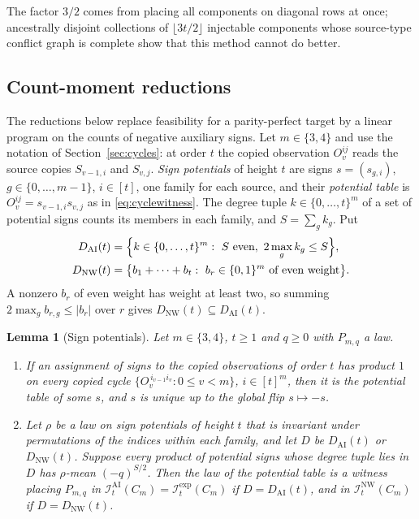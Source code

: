 \documentclass[11pt]{article}
\theoremstyle{plain}
\newtheorem{lemma}[theorem]{Lemma}
\theoremstyle{definition}
\newcommand{\INW}{\mathcal I^{\mathrm{NW}}}
\newcommand{\IAI}{\mathcal I^{\mathrm{AI}}}
\newcommand{\Iexp}{\mathcal I^{\mathrm{exp}}}
\begin{document}
The factor $3/2$ comes from placing all components on diagonal rows at once; ancestrally disjoint collections of $\lfloor3t/2\rfloor$ injectable components whose source-type conflict graph is complete show that this method cannot do better.

\subsection{Count-moment reductions}\label{app:countmoment}

The reductions below replace feasibility for a parity-perfect target by a linear program on the counts of negative auxiliary signs. Let $m\in\{3,4\}$ and use the notation of Section~\ref{sec:cycles}: at order $t$ the copied observation $O_v^{ij}$ reads the source copies $S_{v-1,i}$ and $S_{v,j}$. \emph{Sign potentials} of height $t$ are signs $s=(s_{g,i})$, $g\in\{0,\dots,m-1\}$, $i\in[t]$, one family for each source, and their \emph{potential table} is $O_v^{ij}=s_{v-1,i}s_{v,j}$ as in \eqref{eq:cyclewitness}. The degree tuple $k\in\{0,\dots,t\}^m$ of a set of potential signs counts its members in each family, and $S=\sum_gk_g$. Put
\[
\begin{aligned}
D_{\mathrm{AI}}(t)&=\Bigl\{k\in\{0,\dots,t\}^m:\ S\text{ even},\ 2\max_gk_g\le S\Bigr\},\\
D_{\mathrm{NW}}(t)&=\bigl\{b_1+\dots+b_t:\ b_r\in\{0,1\}^m\text{ of even weight}\bigr\}.
\end{aligned}
\]
A nonzero $b_r$ of even weight has weight at least two, so summing $2\max_gb_{r,g}\le|b_r|$ over $r$ gives $D_{\mathrm{NW}}(t)\subseteq D_{\mathrm{AI}}(t)$.

\begin{lemma}[Sign potentials]\label{lem:potentials}
Let $m\in\{3,4\}$, $t\ge1$ and $q\ge0$ with $P_{m,q}$ a law.
\begin{enumerate}[label=(\roman*),nosep]
\item If an assignment of signs to the copied observations of order $t$ has product $1$ on every copied cycle $\{O_v^{\,i_{v-1}i_v}:0\le v<m\}$, $i\in[t]^m$, then it is the potential table of some $s$, and $s$ is unique up to the global flip $s\mapsto-s$.
\item Let $\rho$ be a law on sign potentials of height $t$ that is invariant under permutations of the indices within each family, and let $D$ be $D_{\mathrm{AI}}(t)$ or $D_{\mathrm{NW}}(t)$. Suppose every product of potential signs whose degree tuple lies in $D$ has $\rho$-mean $(-q)^{S/2}$. Then the law of the potential table is a witness placing $P_{m,q}$ in $\IAI_t(C_m)=\Iexp_t(C_m)$ if $D=D_{\mathrm{AI}}(t)$, and in $\INW_t(C_m)$ if $D=D_{\mathrm{NW}}(t)$.
\end{enumerate}
\end{lemma}
\end{document}
